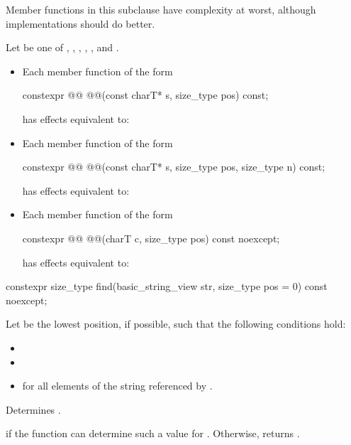\pnum
Member functions in this subclause have complexity  at worst,
although implementations should do better.

\pnum
Let  be one of
,
,
,
,
,
and
.
\begin{itemize}
\item
Each member function of the form
\begin{codeblock}
constexpr @@ @@(const charT* s, size_type pos) const;
\end{codeblock}
has effects equivalent to: 

\item
Each member function of the form
\begin{codeblock}
constexpr @@ @@(const charT* s, size_type pos, size_type n) const;
\end{codeblock}
has effects equivalent to: 

\item
Each member function of the form
\begin{codeblock}
constexpr @@ @@(charT c, size_type pos) const noexcept;
\end{codeblock}
has effects equivalent to: 
\end{itemize}

%
\begin{itemdecl}
constexpr size_type find(basic_string_view str, size_type pos = 0) const noexcept;
\end{itemdecl}

\begin{itemdescr}
\pnum
Let  be the lowest position, if possible, such that the following conditions hold:
\begin{itemize}
\item
{}
\item
{}
\item
{} for all elements  of the string referenced by .
\end{itemize}

\pnum
\effects
Determines .

\pnum
\returns
{} if the function can determine such a value for .
Otherwise, returns .
\end{itemdescr}

